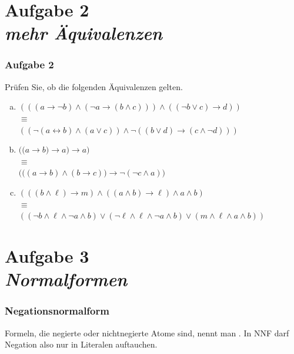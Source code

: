 \documentclass{beamer}
\begin{document}
	\section{Aufgabe 2 \\ \itshape mehr Äquivalenzen}

	\begin{frame} \frametitle{Aufgabe 2}
		\small
		Prüfen Sie, ob die folgenden Äquivalenzen gelten.
		\begin{enumerate}[(a)]
			\item $(((a \to \lnot b) \land (\lnot a \to (b \land c))) \land ((\lnot b \lor c) \to d))$ \\
			$\equiv$ \\
			$((\lnot (a \leftrightarrow b) \land (a \lor c)) \land  \lnot ((b \lor d) \to (c \land \lnot d)))$ 
			\medskip
			\item $\Big(  \big( a \to b) \to a \big) \to a \Big)$ \\
			$\equiv$ \\
			$\Big( \big( (a \to b) \land (b \to c) \big) \to \lnot (\lnot c \land a) \Big)$
			\medskip
			\item $(((b \land \ell) \to m) \land ((a \land b) \to \ell) \land a \land b)$ \\
			$\equiv$ \\
			$((\lnot b \land \ell \land \lnot a \land b) \lor (\lnot \ell \land \ell \land \lnot a \land b) \lor (m \land \ell \land a \land b))$
		\end{enumerate}
	\end{frame}

	\section{Aufgabe 3 \\ \itshape Normalformen}
	
	\begin{frame}\frametitle{Negationsnormalform}
		\small
		\medskip
		
		Formeln, die negierte oder nichtnegierte Atome sind, nennt man .
		In NNF darf Negation also nur in Literalen auftauchen.
		\pause
		
	\end{frame}
\end{document}
